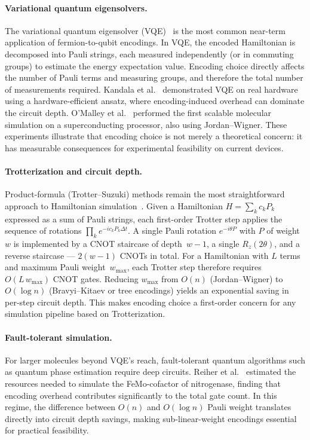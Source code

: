 \paragraph{Variational quantum eigensolvers.}
The variational quantum eigensolver
(VQE)~\cite{peruzzo2014,kandala2017} is the most common near-term
application of fermion-to-qubit encodings.  In VQE, the encoded
Hamiltonian is decomposed into Pauli strings, each measured
independently (or in commuting groups) to estimate the energy
expectation value.  Encoding choice directly affects the number of
Pauli terms and measuring groups, and therefore the total number of
measurements required.  Kandala et al.~\cite{kandala2017} demonstrated
VQE on real hardware using a hardware-efficient ansatz, where
encoding-induced overhead can dominate the circuit depth.  O'Malley et
al.~\cite{omalley2016} performed the first scalable molecular
simulation on a superconducting processor, also using Jordan--Wigner.
These experiments illustrate that encoding choice is not merely a
theoretical concern: it has measurable consequences for experimental
feasibility on current devices.

\paragraph{Trotterization and circuit depth.}
Product-formula (Trotter--Suzuki) methods remain the most
straightforward approach to Hamiltonian
simulation~\cite{lloyd1996,suzuki1976}.
Given a Hamiltonian $H = \sum_k c_k P_k$ expressed as a sum of Pauli
strings, each first-order Trotter step applies the sequence of
rotations $\prod_k e^{-i c_k P_k \Delta t}$.  A single Pauli rotation
$e^{-i\theta P}$ with $P$ of weight~$w$ is implemented by a CNOT
staircase of depth~$w-1$, a single $R_z(2\theta)$, and a reverse
staircase --- $2(w-1)$ CNOTs in total.  For a Hamiltonian with $L$
terms and maximum Pauli weight~$w_{\max}$, each Trotter step therefore
requires $O(L \, w_{\max})$ CNOT gates.  Reducing $w_{\max}$ from
$O(n)$ (Jordan--Wigner) to $O(\log n)$ (Bravyi--Kitaev or tree
encodings) yields an exponential saving in per-step circuit depth.
This makes encoding choice a first-order concern for any simulation
pipeline based on Trotterization.

\paragraph{Fault-tolerant simulation.}
For larger molecules beyond VQE's reach, fault-tolerant quantum
algorithms such as quantum phase estimation require deep circuits.
Reiher et al.~\cite{reiher2017} estimated the resources needed to
simulate the FeMo-cofactor of nitrogenase, finding that encoding
overhead contributes significantly to the total gate count.  In this
regime, the difference between $O(n)$ and $O(\log n)$ Pauli weight
translates directly into circuit depth savings, making
sub-linear-weight encodings essential for practical feasibility.


